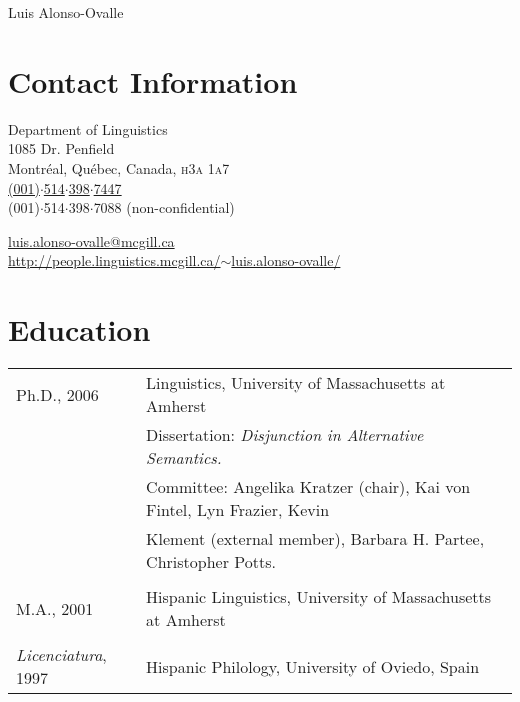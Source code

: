\documentclass[11pt]{article}
\begin{document}
\markright{}
\thispagestyle{plain}
\author{}
\vspace{-2cm}
\begin{center}
{\LARGE Luis Alonso-Ovalle}
\end{center}

\vspace{.4cm}

\section*{Contact Information}
\begin{multicols}{2}
Department of Linguistics\\
1085 Dr. Penfield\\
Montr\'eal, Qu\'ebec, Canada, \textsc{h3a 1a7}\\
\Telefon \hspace{2pt} \href{tel:0015143984353}{(001)$\cdot$514$\cdot$398$\cdot$7447}
\\
\hspace{1pt} \FAX \hspace{1pt} (001)$\cdot$514$\cdot$398$\cdot$7088
(non-confidential) \\
\end{multicols}
\vspace{-12pt}
\Letter \hspace{3pt}  \href{mailto:luis.alonso-ovalle@mcgill.ca}{luis.alonso-ovalle@mcgill.ca}\\
\ComputerMouse \hspace{6pt}
\href{http://people.linguistics.mcgill.ca/~luis.alonso-ovalle/}{http://people.linguistics.mcgill.ca/$\sim$luis.alonso-ovalle/}

\section*{Education}

\begin{tabular}{p{2.815cm}p{280pt}}
Ph.D., 2006 &  Linguistics, University of Massachusetts at Amherst\\
 & {\footnotesize Dissertation: \textit{Disjunction in Alternative Semantics.}}\\
 &  {\footnotesize Committee: Angelika Kratzer (chair), Kai von Fintel, Lyn Frazier,
Kevin}\\
& {\footnotesize Klement (external member), Barbara H. Partee, Christopher Potts.}\\
&  \\[-8pt]
M.A., 2001   & Hispanic Linguistics, University of Massachusetts at Amherst\\
 &  \\[-8pt]
\textit{Licenciatura}, 1997  & Hispanic Philology,  University of Oviedo, Spain\\
\end{tabular}
\end{document}
